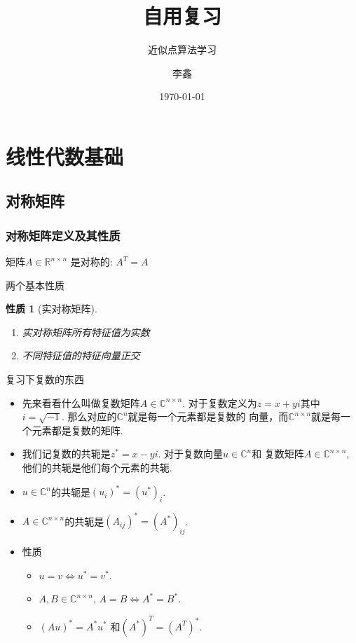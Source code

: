 \documentclass[UTF8, aspectratio=169, 9pt]{ctexbeamer}
\title{自用复习}
\subtitle{近似点算法学习}
\author{李鑫}
\institute{吉林大学}
\date{\today}
\newtheorem{property}{性质}
\begin{document}
\frame{\titlepage}
\frame{\tableofcontents}

\section{线性代数基础}

\subsection{对称矩阵}
\begin{frame}
  \frametitle{对称矩阵定义及其性质}
  \begin{definition}[对称矩阵]
  矩阵$A \in \mathbb{R}^{n \times n}$ 是对称的: $ A^T = A $
  \end{definition}
  两个基本性质
  
  \begin{property}[实对称矩阵]
    \begin{enumerate}
    \item 实对称矩阵所有特征值为实数
    \item 不同特征值的特征向量正交
    \end{enumerate}
  \end{property}

  复习下复数的东西
  \begin{itemize}
  \item 先来看看什么叫做复数矩阵$A \in \mathbb{C}^{n \times n}$. 对于复数定义为$z = x
  + y i$其中$ i = \sqrt {-1} $. 那么对应的$\mathbb{C}^n$就是每一个元素都是复数的
  向量，而$\mathbb{C}^{ n \times n }$就是每一个元素都是复数的矩阵.
  \item 我们记复数的共轭是$z^{*} = x - y i$. 对于复数向量$u \in \mathbb{C}^n$和
    复数矩阵$A \in \mathbb{C}^{n \times n}$, 他们的共轭是他们每个元素的共轭.
  \item $u \in \mathbb{C}^n $的共轭是$(u_i)^{*} = ( u^{*} )_i$.
  \item $A \in \mathbb{C}^{n \times n}$的共轭是$(A_{ij})^{*} = (A^{*})_{ij}$.
  \item 性质
    \begin{itemize}
    \item $u=v \Leftrightarrow u^{*} = v^{*}$.
    \item $A,B \in \mathbb{C}^{n \times n}, \,  A=B  \Leftrightarrow  A^{*}
      = B^{*} $.
    \item $(Au)^{*} = A^{*} u^{*}$ 和$(A^{*})^{T} = (A^{T})^{*}$.
    
    \end{itemize}
  \end{itemize}
  
  
  
\end{frame}
\end{document}
